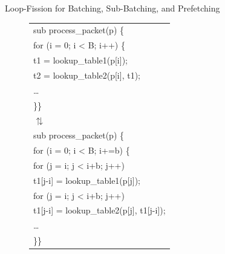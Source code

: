 \documentclass[final]{beamer}
\newlength{\sepwid}
\newlength{\onecolwid}
\newlength{\twocolwid}
\begin{document}
\begin{frame}
\begin{columns}[t]
\begin{column}{\twocolwid}
\begin{exampleblock}{Loop-Fission for Batching, Sub-Batching, and Prefetching}
\begin{multicols}{3}
\begin{figure}[ht]
\begin{tiny}
\begin{tabular}[b]{p{\onecolwid}}
sub{ process\_packet}(p) \{ \\
\hspace{0.2\sepwid}for (i = 0; i < B; i++) \{ \\
\hspace{0.4\sepwid}t1 = lookup\_table1(p[i]); \\
\hspace{0.4\sepwid}t2 = lookup\_table2(p[i], t1); \\
\hspace{0.4\sepwid}\ldots\\
\hspace{0.2\sepwid}\}\hspace{0.2\sepwid}\}\\
\hspace{1\sepwid}$\updownarrows$\\
sub {process\_packet}(p) \{\\
\hspace{0.2\sepwid}for (i = 0; i < B; i+=b) \{\\
\hspace{0.4\sepwid}for (j = i; j < i+b; j++)\\
\hspace{0.6\sepwid}t1[j-i] = lookup\_table1(p[j]);\\
\hspace{0.4\sepwid}for (j = i; j < i+b; j++)\\
\hspace{0.6\sepwid}t1[j-i] = lookup\_table2(p[j], t1[j-i]);\\
\hspace{0.4\sepwid}\ldots\\
\hspace{0.2\sepwid}\}\hspace{0.2\sepwid}\}
\end{tabular}
\end{tiny}
\end{figure}
\begin{figure}[ht]
\begin{tiny}
\begin{tabular}[b]{p{\onecolwid}}


\end{tabular}
\end{tiny}
\end{figure}
\end{multicols}
\end{exampleblock}
\end{column}
\end{columns}
\end{frame}
\end{document}
